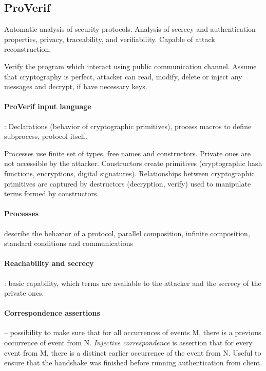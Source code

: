 \documentclass[a4paper, 11pt]{report}
\begin{document}
\subsection{ProVerif}
Automatic analysis of security protocols. Analysis of secrecy and authentication properties, privacy, traceability, and verifiability. Capable of attack reconstruction.

Verify the program which interact using public communication channel. Assume that cryptography is perfect, attacker can read, modify, delete or inject any messages and decrypt, if have necessary keys.

\paragraph{ProVerif input language}: Declarations (behavior of cryptographic primitives), process macros to define subprocess, protocol itself.

Processes use finite set of types, free names and constructors. Private ones are not accessible by the attacker. Constructors create primitives (cryptographic hash functions, encryptions, digital signatures). Relationships between cryptographic primitives are captured by destructors (decryption, verify) used to manipulate terms formed by constructors.

\paragraph{Processes} describe the behavior of a protocol, parallel composition, infinite composition, standard conditions and communications

\paragraph{Reachability and secrecy}: basic capability, which terms are available to the attacker and the secrecy of the private ones.

\paragraph{Correspondence assertions} -- possibility to make sure that for all occurrences of events M, there is a previous occurrence of event from N. \emph{Injective correspondence} is assertion that for every event from M, there is a distinct earlier occurrence of the event from N. Useful to ensure that the handshake was finished before running authentication from client.
\end{document}
